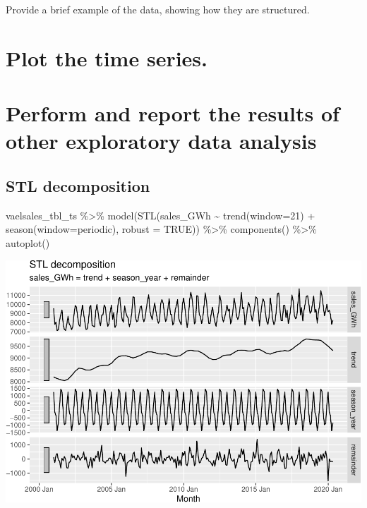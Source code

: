 \documentclass[
]{book}
\newenvironment{Shaded}{\begin{snugshade}}{\end{snugshade}}
\newcommand{\AttributeTok}[1]{\textcolor[rgb]{0.77,0.63,0.00}{#1}}
\newcommand{\ConstantTok}[1]{\textcolor[rgb]{0.00,0.00,0.00}{#1}}
\newcommand{\DecValTok}[1]{\textcolor[rgb]{0.00,0.00,0.81}{#1}}
\newcommand{\FunctionTok}[1]{\textcolor[rgb]{0.00,0.00,0.00}{#1}}
\newcommand{\NormalTok}[1]{#1}
\newcommand{\SpecialCharTok}[1]{\textcolor[rgb]{0.00,0.00,0.00}{#1}}
\newcommand{\StringTok}[1]{\textcolor[rgb]{0.31,0.60,0.02}{#1}}
\begin{document}
Provide a brief example of the data, showing how they are structured.

\hypertarget{plot-the-time-series.}{%
\section{Plot the time series.}\label{plot-the-time-series.}}

\hypertarget{perform-and-report-the-results-of-other-exploratory-data-analysis}{%
\section{Perform and report the results of other exploratory data analysis}\label{perform-and-report-the-results-of-other-exploratory-data-analysis}}

\hypertarget{stl-decomposition}{%
\subsection{STL decomposition}\label{stl-decomposition}}

\begin{Shaded}
\begin{Highlighting}[]
\NormalTok{vaelsales\_tbl\_ts }\SpecialCharTok{\%\textgreater{}\%}
  \FunctionTok{model}\NormalTok{(}\FunctionTok{STL}\NormalTok{(sales\_GWh }\SpecialCharTok{\textasciitilde{}} \FunctionTok{trend}\NormalTok{(}\AttributeTok{window=}\DecValTok{21}\NormalTok{) }\SpecialCharTok{+} \FunctionTok{season}\NormalTok{(}\AttributeTok{window=}\StringTok{\textquotesingle{}periodic\textquotesingle{}}\NormalTok{), }\AttributeTok{robust =} \ConstantTok{TRUE}\NormalTok{)) }\SpecialCharTok{\%\textgreater{}\%}
  \FunctionTok{components}\NormalTok{() }\SpecialCharTok{\%\textgreater{}\%}
  \FunctionTok{autoplot}\NormalTok{()}
\end{Highlighting}
\end{Shaded}

\includegraphics{graphics/perform additive STL decomposition of the VA electricity sales time series 2-1.pdf}
\end{document}
